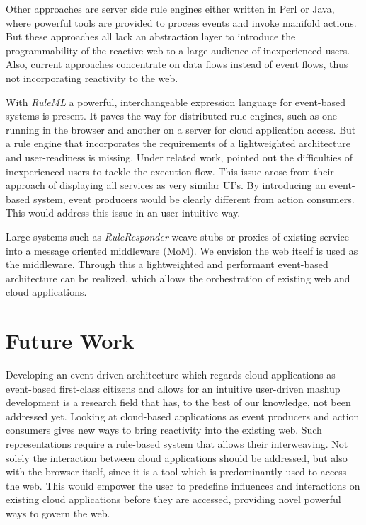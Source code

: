 \documentclass[11pt]{article}%
\begin{document}
Other approaches are server side rule engines either written in Perl or Java, where powerful tools are provided to process events and invoke manifold actions. But these approaches all lack an abstraction layer to introduce the programmability of the reactive web to a large audience of inexperienced users. Also, current approaches concentrate on data flows instead of event flows, thus not incorporating reactivity to the web.

With \emph{RuleML} a powerful, interchangeable expression language for event-based systems is present. It paves the way for distributed rule engines, such as one running in the browser and another on a server for cloud application access. But a rule engine that incorporates the requirements of a lightweighted architecture and user-readiness is missing. Under related work, \cite{2010-Namoun_etal-EURCW.pdf} pointed out the difficulties of inexperienced users to tackle the execution flow. This issue arose from their approach of displaying all services as very similar UI's. By introducing an event-based system, event producers would be clearly different from action consumers. This would address this issue in an user-intuitive way.

Large systems such as \emph{RuleResponder} weave stubs or proxies of existing service into a message oriented middleware (MoM). We envision the web itself is used as the middleware. Through this a lightweighted and performant event-based architecture can be realized, which allows the orchestration of existing web and cloud applications.

\section{Future Work}
Developing an event-driven architecture which regards cloud applications as event-based first-class citizens and allows for an intuitive user-driven mashup development is a research field that has, to the best of our knowledge, not been addressed yet. Looking at cloud-based applications as event producers and action consumers gives new ways to bring reactivity into the existing web. Such representations require a rule-based system that allows their interweaving. Not solely the interaction between cloud applications should be addressed, but also with the browser itself, since it is a tool which is predominantly used to access the web. This would empower the user to predefine influences and interactions on existing cloud applications before they are accessed, providing novel powerful ways to govern the web.
\end{document}
